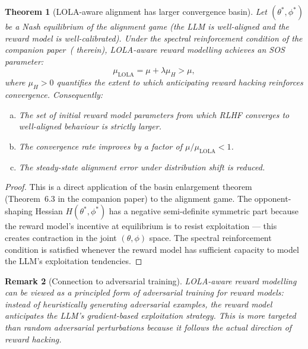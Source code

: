 \documentclass[11pt,a4paper]{article}
\newtheorem{theorem}{Theorem}[section]
\newtheorem{remark}[theorem]{Remark}
\begin{document}
\begin{theorem}[LOLA-aware alignment has larger convergence basin]
\label{thm:lola-alignment-basin}
Let $(\theta^*, \phi^*)$ be a Nash equilibrium of the alignment game (the LLM is well-aligned and the reward model is well-calibrated). Under the spectral reinforcement condition of the companion paper~( therein), LOLA-aware reward modelling achieves an SOS parameter:
\begin{equation}
    \mu_{\mathrm{LOLA}} = \mu + \lambda \mu_H > \mu,
\end{equation}
where $\mu_H > 0$ quantifies the extent to which anticipating reward hacking reinforces convergence. Consequently:
\begin{enumerate}[(a)]
    \item The set of initial reward model parameters from which RLHF converges to well-aligned behaviour is strictly larger.
    \item The convergence rate improves by a factor of $\mu / \mu_{\mathrm{LOLA}} < 1$.
    \item The steady-state alignment error under distribution shift is reduced.
\end{enumerate}
\end{theorem}

\begin{proof}
This is a direct application of the basin enlargement theorem (Theorem~6.3 in the companion paper) to the alignment game. The opponent-shaping Hessian $H(\theta^*, \phi^*)$ has a negative semi-definite symmetric part because the reward model's incentive at equilibrium is to resist exploitation --- this creates contraction in the joint $(\theta, \phi)$ space. The spectral reinforcement condition is satisfied whenever the reward model has sufficient capacity to model the LLM's exploitation tendencies.
\end{proof}

\begin{remark}[Connection to adversarial training]
LOLA-aware reward modelling can be viewed as a principled form of adversarial training for reward models: instead of heuristically generating adversarial examples, the reward model anticipates the LLM's \emph{gradient-based} exploitation strategy. This is more targeted than random adversarial perturbations because it follows the actual direction of reward hacking.
\end{remark}


\end{document}
